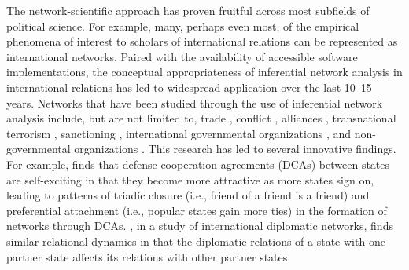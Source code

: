 \documentclass[fleqn,12pt]{wlscirep}
\begin{document}
The network-scientific approach has proven fruitful across most subfields of political science. For example, many, perhaps even most, of the empirical phenomena of interest to scholars of international relations can be represented as international networks. Paired with the availability of accessible software implementations, the conceptual appropriateness of inferential network analysis in international relations has led to widespread application over the last 10--15 years. Networks that have been studied through the use of inferential network analysis include, but are not limited to, trade \citep{ward2007persistent,fagiolo2014does,chu2010homogenization,chyzh2016dangerous}, conflict \citep{ward2007disputes,cranmer2011inferential,gallop2016endogenous,dorff2013networks}, alliances \citep{cranmer2012complex}, transnational terrorism \citep{desmarais2013forecasting,asal2016friends,metternich2013antigovernment,bush2015measuring}, sanctioning \citep{cranmer2014reciprocity,dorff2017states}, international governmental organizations \citep{davis2017forces,cao2012global,lupu2017networked}, and non-governmental organizations \citep{atouba2015international}. This research has led to several innovative findings. For example, \cite{kinne2018defense} finds that defense cooperation agreements (DCAs) between states are self-exciting in that they become more attractive as more states sign on, leading to patterns of triadic closure (i.e., friend of a friend is a friend) and preferential attachment (i.e., popular states gain more ties) in the formation of networks through DCAs. \cite{duque2018recognizing}, in a study of international diplomatic networks, finds similar relational dynamics in that the diplomatic relations of a state with one partner state affects its relations with other partner states.
\end{document}
